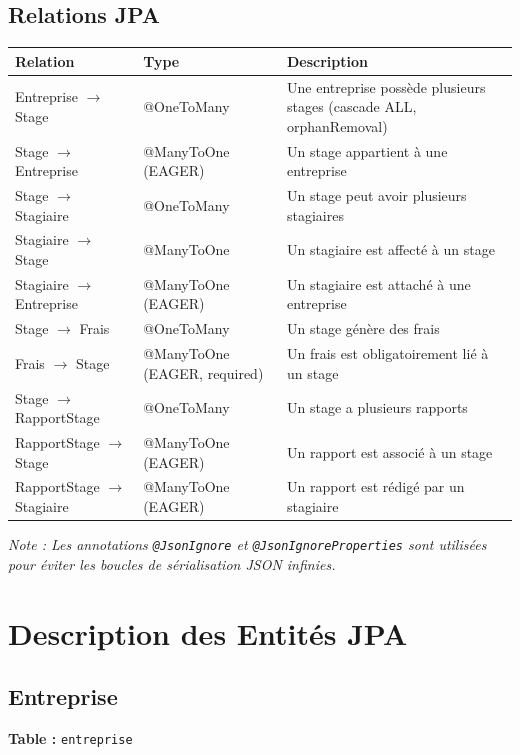 \documentclass[12pt,a4paper]{report}
\begin{document}
\section{Relations JPA}

\begin{longtable}{|l|l|p{7cm}|}
\hline
\textbf{Relation} & \textbf{Type} & \textbf{Description} \\ \hline \endhead
Entreprise $\rightarrow$ Stage & @OneToMany & Une entreprise possède plusieurs stages (cascade ALL, orphanRemoval) \\ \hline
Stage $\rightarrow$ Entreprise & @ManyToOne (EAGER) & Un stage appartient à une entreprise \\ \hline
Stage $\rightarrow$ Stagiaire & @OneToMany & Un stage peut avoir plusieurs stagiaires \\ \hline
Stagiaire $\rightarrow$ Stage & @ManyToOne & Un stagiaire est affecté à un stage \\ \hline
Stagiaire $\rightarrow$ Entreprise & @ManyToOne (EAGER) & Un stagiaire est attaché à une entreprise \\ \hline
Stage $\rightarrow$ Frais & @OneToMany & Un stage génère des frais \\ \hline
Frais $\rightarrow$ Stage & @ManyToOne (EAGER, required) & Un frais est obligatoirement lié à un stage \\ \hline
Stage $\rightarrow$ RapportStage & @OneToMany & Un stage a plusieurs rapports \\ \hline
RapportStage $\rightarrow$ Stage & @ManyToOne (EAGER) & Un rapport est associé à un stage \\ \hline
RapportStage $\rightarrow$ Stagiaire & @ManyToOne (EAGER) & Un rapport est rédigé par un stagiaire \\ \hline
\end{longtable}

\textit{Note : Les annotations \texttt{@JsonIgnore} et \texttt{@JsonIgnoreProperties} sont utilisées pour éviter les boucles de sérialisation JSON infinies.}

\chapter{Description des Entités JPA}

\section{Entreprise}
\textbf{Table :} \texttt{entreprise}
\end{document}
